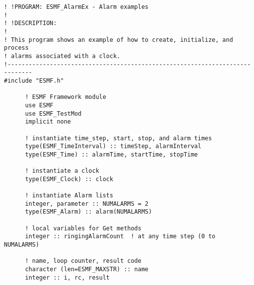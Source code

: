  
\setlength{\oldparskip}{\parskip}
\setlength{\parskip}{1.5ex}
\setlength{\oldparindent}{\parindent}
\setlength{\parindent}{0pt}
\setlength{\oldbaselineskip}{\baselineskip}
\setlength{\baselineskip}{11pt}
 
\def\bv{\begin{verbatim}}
\def\ev{\end{verbatim}}
\def\be{\begin{equation}}
\def\ee{\end{equation}}
\def\bea{\begin{eqnarray}}
\def\eea{\end{eqnarray}}
\def\bi{\begin{itemize}}
\def\ei{\end{itemize}}
\def\bn{\begin{enumerate}}
\def\en{\end{enumerate}}
\def\bd{\begin{description}}
\def\ed{\end{description}}
\def\({\left (}
\def\){\right )}
\def\[{\left [}
\def\]{\right ]}
\def\<{\left  \langle}
\def\>{\right \rangle}
\def\cI{{\cal I}}
\def\diag{\mathop{\rm diag}}
\def\tr{\mathop{\rm tr}}


 

 \begin{verbatim}
! !PROGRAM: ESMF_AlarmEx - Alarm examples
!
! !DESCRIPTION:
!
! This program shows an example of how to create, initialize, and process
! alarms associated with a clock.
!-----------------------------------------------------------------------------
#include "ESMF.h"

      ! ESMF Framework module
      use ESMF
      use ESMF_TestMod
      implicit none

      ! instantiate time_step, start, stop, and alarm times
      type(ESMF_TimeInterval) :: timeStep, alarmInterval
      type(ESMF_Time) :: alarmTime, startTime, stopTime

      ! instantiate a clock 
      type(ESMF_Clock) :: clock

      ! instantiate Alarm lists
      integer, parameter :: NUMALARMS = 2
      type(ESMF_Alarm) :: alarm(NUMALARMS)

      ! local variables for Get methods
      integer :: ringingAlarmCount  ! at any time step (0 to NUMALARMS)

      ! name, loop counter, result code
      character (len=ESMF_MAXSTR) :: name
      integer :: i, rc, result
 
\end{verbatim}
 
